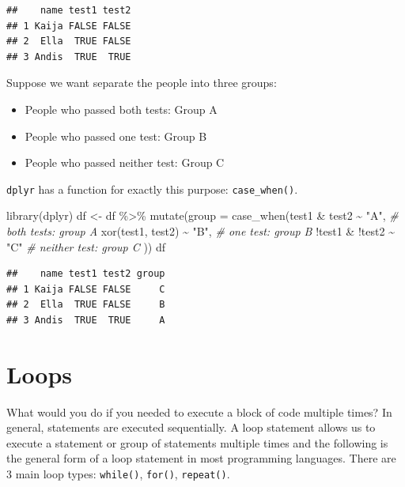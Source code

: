 \documentclass[
]{book}
\newenvironment{Shaded}{\begin{snugshade}}{\end{snugshade}}
\newcommand{\AttributeTok}[1]{\textcolor[rgb]{0.77,0.63,0.00}{#1}}
\newcommand{\CommentTok}[1]{\textcolor[rgb]{0.56,0.35,0.01}{\textit{#1}}}
\newcommand{\FunctionTok}[1]{\textcolor[rgb]{0.00,0.00,0.00}{#1}}
\newcommand{\NormalTok}[1]{#1}
\newcommand{\OtherTok}[1]{\textcolor[rgb]{0.56,0.35,0.01}{#1}}
\newcommand{\SpecialCharTok}[1]{\textcolor[rgb]{0.00,0.00,0.00}{#1}}
\newcommand{\StringTok}[1]{\textcolor[rgb]{0.31,0.60,0.02}{#1}}
\providecommand{\tightlist}{%
  \setlength{\itemsep}{0pt}\setlength{\parskip}{0pt}}
\begin{document}
\begin{verbatim}
##    name test1 test2
## 1 Kaija FALSE FALSE
## 2  Ella  TRUE FALSE
## 3 Andis  TRUE  TRUE
\end{verbatim}

Suppose we want separate the people into three groups:

\begin{itemize}
\tightlist
\item
  People who passed both tests: Group A\\
\item
  People who passed one test: Group B
\item
  People who passed neither test: Group C
\end{itemize}

\texttt{dplyr} has a function for exactly this purpose: \texttt{case\_when()}.

\begin{Shaded}
\begin{Highlighting}[]
\FunctionTok{library}\NormalTok{(dplyr)}
\NormalTok{df }\OtherTok{\textless{}{-}}\NormalTok{ df }\SpecialCharTok{\%\textgreater{}\%} 
\FunctionTok{mutate}\NormalTok{(}\AttributeTok{group =} \FunctionTok{case\_when}\NormalTok{(test1 }\SpecialCharTok{\&}\NormalTok{ test2 }\SpecialCharTok{\textasciitilde{}} \StringTok{"A"}\NormalTok{, }\CommentTok{\# both tests: group A}
                         \FunctionTok{xor}\NormalTok{(test1, test2) }\SpecialCharTok{\textasciitilde{}} \StringTok{"B"}\NormalTok{, }\CommentTok{\# one test: group B}
                         \SpecialCharTok{!}\NormalTok{test1 }\SpecialCharTok{\&} \SpecialCharTok{!}\NormalTok{test2 }\SpecialCharTok{\textasciitilde{}} \StringTok{"C"} \CommentTok{\# neither test: group C}
\NormalTok{))}
\NormalTok{df}
\end{Highlighting}
\end{Shaded}

\begin{verbatim}
##    name test1 test2 group
## 1 Kaija FALSE FALSE     C
## 2  Ella  TRUE FALSE     B
## 3 Andis  TRUE  TRUE     A
\end{verbatim}

\hypertarget{loops}{%
\section{Loops}\label{loops}}

What would you do if you needed to execute a block of code multiple times? In general, statements are executed sequentially. A loop statement allows us to execute a statement or group of statements multiple times and the following is the general form of a loop statement in most programming languages. There are 3 main loop types: \texttt{while()}, \texttt{for()}, \texttt{repeat()}.
\end{document}
